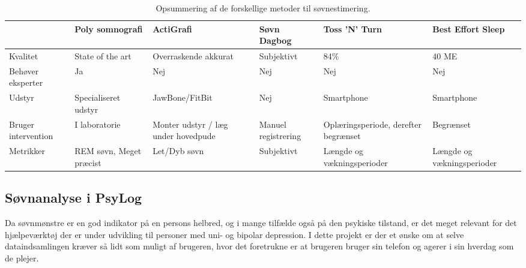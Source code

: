 \begin{table}[h]
\begin{tabular}{|p{1.5cm}|p{2cm}|p{3cm}|p{2cm}|p{3cm}|p{2cm}|}
\hline                    	& Poly somnografi      		& ActiGrafi                           & Søvn Dagbog          & Toss 'N' Turn                        & Best Effort Sleep \\ 
\hline Kvalitet           	& State of the art			& Overraskende akkurat                & Subjektivt           & 84\%   		& 40 ME \\ 
\hline Behøver eksperter   	& Ja						& Nej                                 & Nej                  & Nej    		& Nej \\ 
\hline Udstyr              	& Specialiseret udstyr		& JawBone/FitBit                      & Nej                  & Smartphone   & Smartphone \\ 
\hline Bruger intervention 	& I laboratorie	& Monter udstyr / læg under hovedpude & Manuel registrering  & Oplæringsperiode, derefter begrænset & Begrænset \\ 
\hline Metrikker           	& REM søvn, Meget præcist	& Let/Dyb søvn                        & Subjektivt           & Længde og vækningsperioder & Længde og vækningsperioder \\ 
\hline 
\end{tabular}
\caption{Opsummering af de forskellige metoder til søvnestimering.}
\label{tab:opsummeringMetoder}
\end{table}

\subsection{Søvnanalyse i PsyLog}
Da søvnmønstre er en god indikator på en persons helbred, og i mange tilfælde også på den psykiske tilstand, er det meget relevant for det hjælpeværktøj der er under udvikling til personer med uni- og bipolar depression.
I dette projekt er der et ønske om at selve dataindsamlingen kræver så lidt som muligt af brugeren, hvor det foretrukne er at brugeren bruger sin telefon og agerer i sin hverdag som de plejer.

